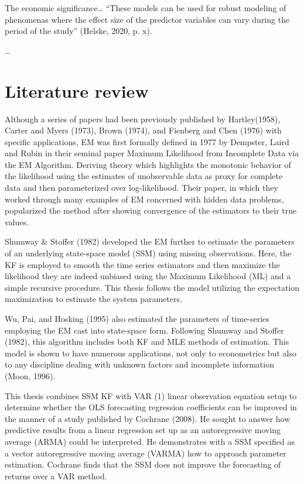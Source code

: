 \documentclass[12pt, letterpaper, twoside]{article}
\begin{document}
	The economic significance… “These models can be used for robust modeling of phenomenas where the effect size of the predictor variables can vary during the period of the study” (Helske, 2020, p. x).


… 
\section{Literature review}
Although a series of papers had been previously published by Hartley(1958), Carter and Myers (1973), Brown (1974), and Fienberg and Chen (1976) with specific applications, EM was first formally defined in 1977 by Dempster, Laird and Rubin in their seminal paper Maximum Likelihood from Incomplete Data via the EM Algorithm. Deriving theory which highlights the monotonic behavior of the likelihood using the estimates of unobservable data as proxy for complete data and then parameterized over log-likelihood. Their paper, in which they worked through many examples of EM concerned with hidden data problems, popularized the method after showing convergence of the estimators to their true values. 

Shumway & Stoffer (1982) developed the EM further to estimate the parameters of an underlying state-space model (SSM) using missing observations. Here, the KF is employed to smooth the time series estimators and then maximize the likelihood they are indeed unbiased using the Maximum Likelihood (ML) and a simple recursive procedure. This thesis follows the model utilizing the expectation maximization to estimate the system parameters.

Wu, Pai, and Hosking (1995) also estimated the parameters of time-series employing the EM cast into state-space form. Following Shumway and Stoffer (1982), this algorithm includes both KF and MLE methods of estimation. This model is shown to have numerous applications, not only to econometrics but also to any discipline dealing with unknown factors and incomplete information (Moon, 1996).

This thesis combines SSM KF with VAR (1) linear observation equation setup to determine whether the OLS forecasting regression coefficients can be improved in the manner of a study published by Cochrane (2008). He sought to answer how predictive results from a linear regression set up as an autoregressive moving average (ARMA) could be interpreted. He demonstrates with a SSM specified as a vector autoregressive moving average (VARMA) how to approach parameter estimation. Cochrane finds that the SSM does not improve the forecasting of returns over a VAR method. 
\end{document}
